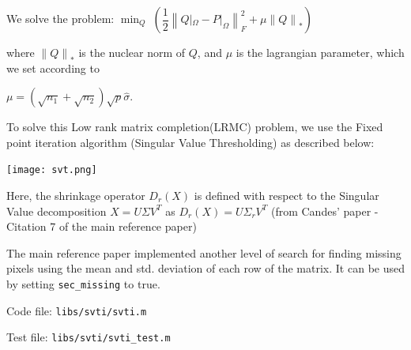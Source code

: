 \documentclass[fleqn, 11pt]{article}
\newcommand\norm[1]{\left\lVert#1\right\rVert}
\begin{document}
We solve the problem: \hspace{5pt}
$\min_Q \; ( \dfrac{1}{2} \norm{ Q|_{\Omega} - P|_{\Omega} }_F^2 + \mu \norm{Q}_{*} ) $

\medskip

where $ \norm{Q}_{*} $ is the nuclear norm of $Q$, and $\mu$ is the lagrangian parameter,
which we set according to 

\smallskip

$\mu =  (\sqrt{n_1} + \sqrt{n_2}) \sqrt{p} \hat{\sigma} $. 

\bigskip 

To solve this Low rank matrix completion(LRMC) problem, we use the Fixed point iteration algorithm (Singular Value Thresholding) as described below: 

\bigskip

\texttt{[image: svt.png]}

Here, the shrinkage operator $D_r(X)$ is defined with respect to the Singular Value decomposition $X=U\Sigma V^T$ as $D_r(X)=U\Sigma_r V^T$ (from Candes' paper - Citation 7 of the main reference paper)

The main reference paper implemented another level of search for finding missing pixels using the mean and std. deviation of each row of the matrix. It can be used by setting \texttt{sec\_missing} to true.

\medskip

Code file: \texttt{libs/svti/svti.m}

Test file: \texttt{libs/svti/svti\_test.m}

\end{document}

